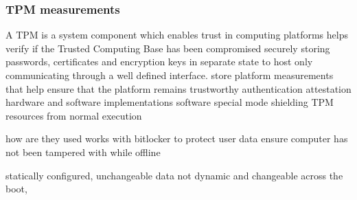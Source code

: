 \subsubsection{TPM measurements}
A \acf{TPM} is a system component which enables trust in computing platforms
helps verify if the Trusted Computing Base has been compromised
securely storing passwords, certificates and encryption keys in separate state to host
only communicating through a well defined interface.
store platform measurements that help ensure that the platform remains trustworthy
authentication
attestation
hardware and software implementations
software special mode shielding TPM resources from normal execution
\cite{tcg-tpm-summary}
\cite{tcg-tpm-library-part1-architecture}

how are they used
works with bitlocker to protect user data
ensure computer has not been tampered with while offline

statically configured, unchangeable data
not dynamic and changeable across the boot,
\cite{tianocore-trusted-boot-chain}

